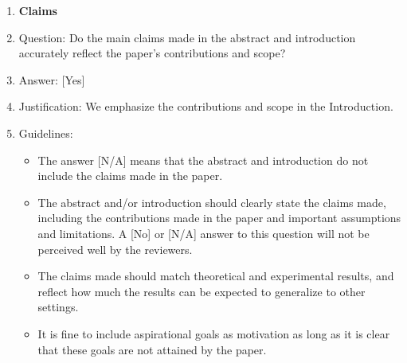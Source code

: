 \documentclass{llmxive}
\providecommand{\answerYes}[1][]{[Yes]#1}
\providecommand{\answerNo}[1][]{[No]#1}
\providecommand{\answerNA}[1][]{[N/A]#1}
\begin{document}
{\begin{enumerate}
\item {\bf Claims}
    \item[] Question: Do the main claims made in the abstract and introduction accurately reflect the paper's contributions and scope?
    \item[] Answer: \answerYes{} %
    \item[] Justification: We emphasize the contributions and scope in the Introduction.
    \item[] Guidelines:
    \begin{itemize}
        \item The answer \answerNA{} means that the abstract and introduction do not include the claims made in the paper.
        \item The abstract and/or introduction should clearly state the claims made, including the contributions made in the paper and important assumptions and limitations. A \answerNo{} or \answerNA{} answer to this question will not be perceived well by the reviewers. 
        \item The claims made should match theoretical and experimental results, and reflect how much the results can be expected to generalize to other settings. 
        \item It is fine to include aspirational goals as motivation as long as it is clear that these goals are not attained by the paper. 
    \end{itemize}


\end{enumerate}}
\end{document}
